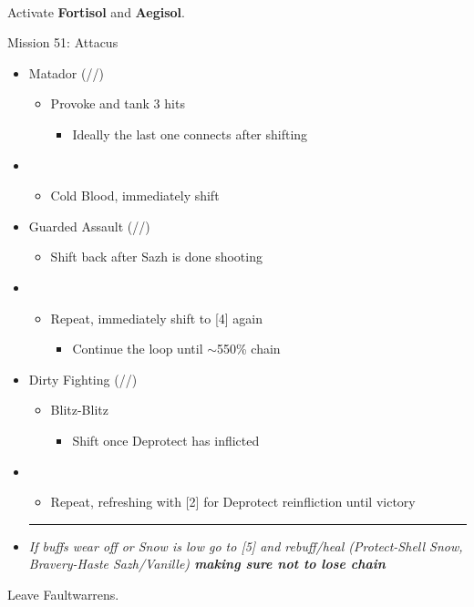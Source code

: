 \renewcommand{\second}{[2] Dirty Fighting (\com/\sen/\sab)}
\renewcommand{\fourth}{[4] Guarded Assault (\sen/\sen/\com)}
\renewcommand{\fifth}{[5] Protection (\syn/\sen/\med)}
\renewcommand{\sixth}{[6] Matador (\sen/\rav/\sab)}

\vfill
\ 
\columnbreak

Activate \textbf{Fortisol} and \textbf{Aegisol}.

\begin{battle}{Mission 51: Attacus}
	\begin{itemize}
		\item \sixth
			\begin{itemize}
				\item Provoke and tank 3 hits
					\begin{itemize}
						\item Ideally the last one connects after shifting
					\end{itemize}
			\end{itemize}
		\item \third
			\begin{itemize}
				\item Cold Blood, immediately shift
			\end{itemize}
		\item \fourth
			\begin{itemize}
				\item Shift back after Sazh is done shooting
			\end{itemize}
		\item \third
			\begin{itemize}
				\item Repeat, immediately shift to [4] again
					\begin{itemize}
						\item Continue the loop until $\sim$550\% chain
					\end{itemize}
			\end{itemize}
		\item \second
			\begin{itemize}
				\item Blitz-Blitz
					\begin{itemize}
						\item Shift once Deprotect has inflicted
					\end{itemize}
			\end{itemize}
		\item \first
			\begin{itemize}
				\item Repeat, refreshing with [2] for Deprotect reinfliction until victory
			\end{itemize}
		\rule{.9\columnwidth}{1pt}
		\item \textit{ If buffs wear off or Snow is low go to [5] and rebuff/heal (Protect-Shell Snow, Bravery-Haste Sazh/Vanille) \textbf{making sure not to lose chain}}
	\end{itemize}
\end{battle}

Leave Faultwarrens.
